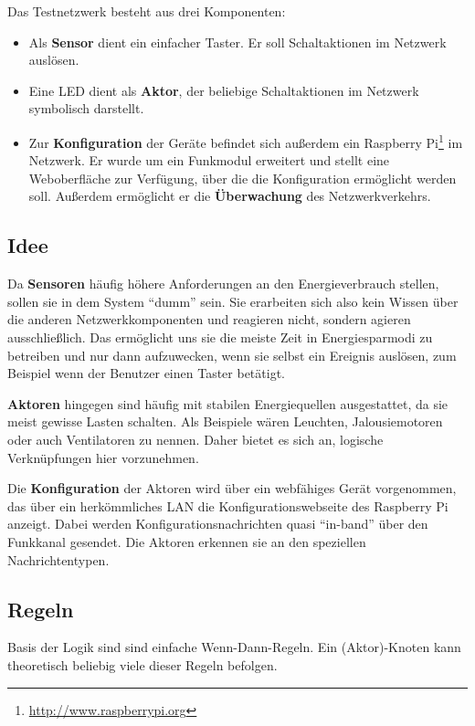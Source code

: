 \documentclass{IEEEtran}
\begin{document}
        Das Testnetzwerk besteht aus drei Komponenten:
        \begin{itemize}
            \item Als \textbf{Sensor} dient ein einfacher Taster.
                Er soll Schaltaktionen im Netzwerk auslösen.
            \item Eine LED dient als \textbf{Aktor},
                der beliebige Schaltaktionen im Netzwerk symbolisch darstellt.
            \item Zur \textbf{Konfiguration} der Geräte befindet sich
                außerdem ein
                Raspberry Pi\footnote{\url{http://www.raspberrypi.org}}
                im Netzwerk.
                Er wurde um ein Funkmodul erweitert und stellt eine
                Weboberfläche zur Verfügung,
                über die die Konfiguration ermöglicht werden soll.
                Außerdem ermöglicht er die \textbf{Überwachung} des Netzwerkverkehrs.
        \end{itemize}

    \subsection{Idee}
        Da \textbf{Sensoren} häufig höhere Anforderungen an den Energieverbrauch
        stellen, sollen sie in dem System \enquote{dumm} sein.
        Sie erarbeiten sich also kein Wissen über die anderen Netzwerkkomponenten
        und reagieren nicht, sondern agieren ausschließlich.
        Das ermöglicht uns sie die meiste Zeit in Energiesparmodi zu betreiben
        und nur dann aufzuwecken, wenn sie selbst ein Ereignis auslösen,
        zum Beispiel wenn der Benutzer einen Taster betätigt.

        \textbf{Aktoren} hingegen sind häufig mit stabilen Energiequellen
        ausgestattet, da sie meist gewisse Lasten schalten.
        Als Beispiele wären Leuchten, Jalousiemotoren oder auch Ventilatoren
        zu nennen.
        Daher bietet es sich an, logische Verknüpfungen hier vorzunehmen.

        Die \textbf{Konfiguration} der Aktoren wird über ein webfähiges Gerät
        vorgenommen, das über ein herkömmliches \ac{LAN} die
        Konfigurationswebseite des Raspberry Pi anzeigt.
        Dabei werden Konfigurationsnachrichten quasi \enquote{in-band}
        über den Funkkanal gesendet.
        Die Aktoren erkennen sie an den speziellen Nachrichtentypen.

    \subsection{Regeln}
        Basis der Logik sind sind einfache Wenn-Dann-Regeln.
        Ein (Aktor)-Knoten kann theoretisch beliebig viele dieser Regeln befolgen.
\end{document}
